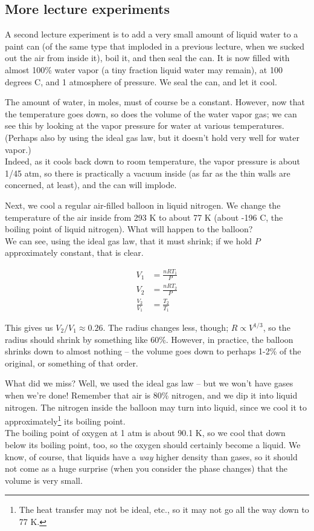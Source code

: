 \subsection{More lecture experiments}

A second lecture experiment is to add a very small amount of liquid water to a paint can (of the same type that imploded in a previous lecture, when we sucked out the air from inside it), boil it, and then seal the can. It is now filled with almost 100\% water vapor (a tiny fraction liquid water may remain), at 100 degrees C, and 1 atmosphere of pressure. We seal the can, and let it cool.

The amount of water, in moles, must of course be a constant. However, now that the temperature goes down, so does the volume of the water vapor gas; we can see this by looking at the vapor pressure for water at various temperatures. (Perhaps also by using the ideal gas law, but it doesn't hold very well for water vapor.)\\
Indeed, as it cools back down to room temperature, the vapor pressure is about 1/45 atm, so there is practically a vacuum inside (as far as the thin walls are concerned, at least), and the can will implode.

Next, we cool a regular air-filled balloon in liquid nitrogen. We change the temperature of the air inside from 293 K to about 77 K (about -196 C, the boiling point of liquid nitrogen). What will happen to the balloon?\\
We can see, using the ideal gas law, that it must shrink; if we hold $P$ approximately constant, that is clear.

\begin{align}
V_1 &= \frac{n R T_1}{P}\\
V_2 &= \frac{n R T_2}{P}\\
\frac{V_2}{V_1} &= \frac{T_2} {T_1}
\end{align}

This gives us $V_2/V_1 \approx 0.26$. The radius changes less, though; $R \propto V^{1/3}$, so the radius should shrink by something like 60\%. However, in practice, the balloon shrinks down to almost nothing -- the volume goes down to perhaps 1-2\% of the original, or something of that order.

What did we miss? Well, we used the ideal gas law -- but we won't have gases when we're done! Remember that air is 80\% nitrogen, and we dip it into liquid nitrogen. The nitrogen inside the balloon may turn into liquid, since we cool it to approximately\footnote{The heat transfer may not be ideal, etc., so it may not go all the way down to 77 K.} its boiling point.\\
The boiling point of oxygen at 1 atm is about 90.1 K, so we cool that down below its boiling point, too, so the oxygen should certainly become a liquid. We know, of course, that liquids have a \emph{way} higher density than gases, so it should not come as a huge surprise (when you consider the phase changes) that the volume is very small.

